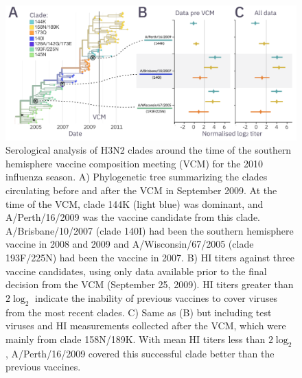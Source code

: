 \documentclass[utf8]{FrontiersinHarvard} %
\begin{document}
\begin{figure}[h!]
  \begin{center}
    \includegraphics[width=\textwidth]{figures/figure-3}
  \end{center}
  \caption{
    Serological analysis of H3N2 clades around the time of the southern hemisphere vaccine composition meeting (VCM) for the 2010 influenza season.
    A) Phylogenetic tree summarizing the clades circulating before and after the VCM in September 2009.
    At the time of the VCM, clade 144K (light blue) was dominant, and A/Perth/16/2009 was the vaccine candidate from this clade.
    A/Brisbane/10/2007 (clade 140I) had been the southern hemisphere vaccine in 2008 and 2009 and A/Wisconsin/67/2005 (clade 193F/225N) had been the vaccine in 2007.
    B) HI titers against three vaccine candidates, using only data available prior to the final decision from the VCM (September 25, 2009).
    HI titers greater than $2\log_{2}$ indicate the inability of previous vaccines to cover viruses from the most recent clades.
    C) Same as (B) but including test viruses and HI measurements collected after the VCM, which were mainly from clade 158N/189K.
    With mean HI titers less than $2\log_{2}$, A/Perth/16/2009 covered this successful clade better than the previous vaccines.
  }
  \label{fig:3}
\end{figure}
\end{document}
